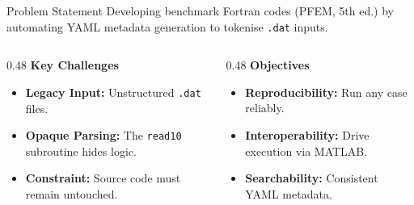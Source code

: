 \documentclass[aspectratio=169]{beamer}
\begin{document}
\begin{frame}[shrink=5]{Problem Statement}
    Developing benchmark Fortran codes (PFEM, 5th ed.) by automating YAML metadata generation to tokenise \texttt{.dat} inputs.

    \vspace{0.4cm}
    \begin{columns}[t]
        \begin{column}{0.48\textwidth}
            \textbf{Key Challenges}
            \begin{itemize}
                \setlength\itemsep{0.3em}
                \item \textbf{Legacy Input:} Unstructured \texttt{.dat} files.
                \item \textbf{Opaque Parsing:} The \texttt{read10} subroutine hides logic.
                \item \textbf{Constraint:} Source code must remain untouched.
            \end{itemize}
        \end{column}
        \begin{column}{0.48\textwidth}
            \textbf{Objectives}
            \begin{itemize}
                \setlength\itemsep{0.3em}
                \item \textbf{Reproducibility:} Run any case reliably.
                \item \textbf{Interoperability:} Drive execution via MATLAB.
                \item \textbf{Searchability:} Consistent YAML metadata.
            \end{itemize}
        \end{column}
    \end{columns}
\end{frame}
\end{document}
